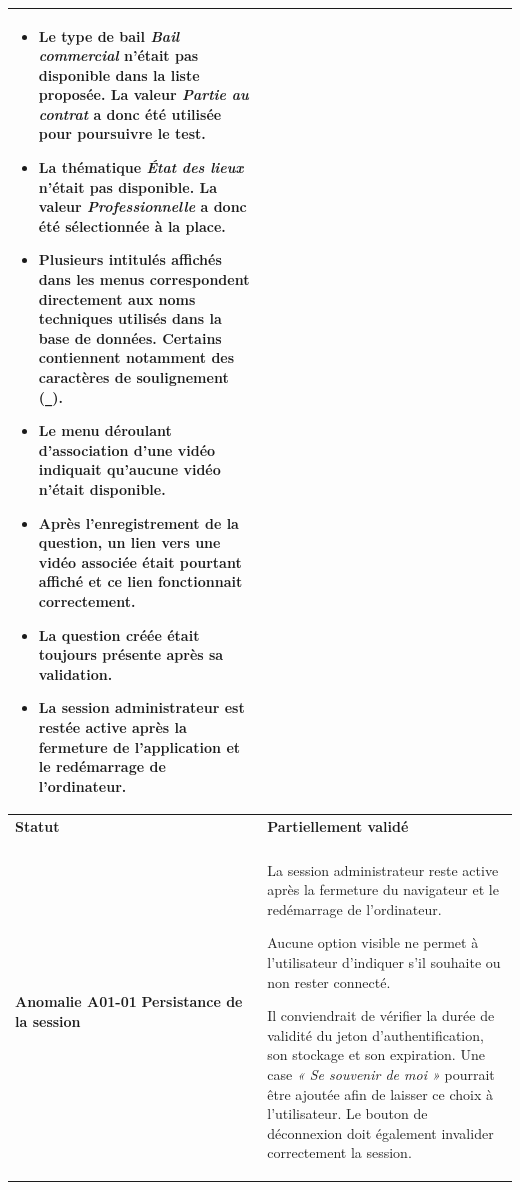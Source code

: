 \begin{longtable}{
    |>{\raggedright\arraybackslash}p{}
    |>{\raggedright\arraybackslash}p{}|
}
\begin{itemize}[leftmargin=*,nosep]
    \item Le type de bail \textit{Bail commercial} n'était pas disponible
    dans la liste proposée. La valeur \textit{Partie au contrat} a donc été
    utilisée pour poursuivre le test.

    \item La thématique \textit{État des lieux} n'était pas disponible.
    La valeur \textit{Professionnelle} a donc été sélectionnée à la place.

    \item Plusieurs intitulés affichés dans les menus correspondent
    directement aux noms techniques utilisés dans la base de données.
    Certains contiennent notamment des caractères de soulignement
    (\texttt{\_}).

    \item Le menu déroulant d'association d'une vidéo indiquait qu'aucune
    vidéo n'était disponible.

    \item Après l'enregistrement de la question, un lien vers une vidéo
    associée était pourtant affiché et ce lien fonctionnait correctement.

    \item La question créée était toujours présente après sa validation.

    \item La session administrateur est restée active après la fermeture
    de l'application et le redémarrage de l'ordinateur.
\end{itemize}
\\
\hline

\textbf{Statut}
&
\textbf{Partiellement validé}
\\
\hline


\rowcolor{orange!15}
\multicolumn{2}{|c|}{
    \textbf{Commentaires et anomalies constatées}
}
\\
\hline

\textbf{Anomalie A01-01}\newline
\textbf{Persistance de la session}
&
La session administrateur reste active après la fermeture du navigateur et
le redémarrage de l'ordinateur.

Aucune option visible ne permet à l'utilisateur d'indiquer s'il souhaite ou
non rester connecté.

Il conviendrait de vérifier la durée de validité du jeton
d'authentification, son stockage et son expiration. Une case
\textit{« Se souvenir de moi »} pourrait être ajoutée afin de laisser ce
choix à l'utilisateur. Le bouton de déconnexion doit également invalider
correctement la session.
\\
\hline


\end{longtable}
